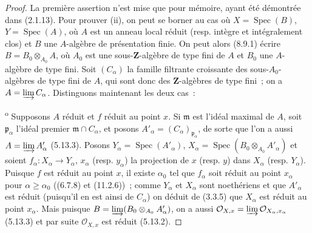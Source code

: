 \begin{proof}
La première assertion n'est mise que pour mémoire, ayant été démontrée dans
(2.1.13). Pour prouver (ii), on peut se borner au cas où $X=\operatorname{Spec}(B)$,
$Y=\operatorname{Spec}(A)$, où $A$ est un anneau local réduit (resp. intègre et
intégralement clos) et $B$ une $A$-algèbre de présentation finie. On peut alors
(8.9.1) écrire $B=B_0\otimes_{A_0}A$,
où $A_0$ est une sous-$\mathbf Z$-algèbre de type fini de $A$ et $B_0$ une
$A$-algèbre de type fini. Soit $(C_\alpha)$ la famille filtrante croissante
des sous-$A_0$-algèbres de type fini de $A$, qui sont donc des
$\mathbf Z$-algèbres de type fini~; on a $A=\varinjlim C_\alpha$. Distinguons
maintenant les deux cas~:

\textsuperscript{o} Supposons $A$ réduit et $f$ réduit au point
$x$. Si $\mathfrak m$ est l'idéal maximal de $A$, soit
$\mathfrak p_\alpha$ l'idéal premier $\mathfrak m\cap C_\alpha$, et posons
$A'_\alpha=(C_\alpha)_{\mathfrak p_\alpha}$, de sorte que l'on a aussi
$A=\varinjlim A'_\alpha$ (5.13.3). Posons
$Y_\alpha=\operatorname{Spec}(A'_\alpha)$,
$X_\alpha=\operatorname{Spec}(B_0\otimes_{A_0}A'_\alpha)$ et soient
$f_\alpha:X_\alpha\to Y_\alpha$, $x_\alpha$ (resp. $y_\alpha$) la projection
de $x$ (resp. $y$) dans $X_\alpha$ (resp. $Y_\alpha$). Puisque $f$ est réduit
au point $x$, il existe $\alpha_0$ tel que $f_\alpha$ soit réduit au point
$x_\alpha$ pour $\alpha\geq\alpha_0$ ((6.7.8) et (11.2.6))~; comme
$Y_\alpha$ et $X_\alpha$ sont noethériens et que $A'_\alpha$ est réduit
(puisqu'il en est ainsi de $C_\alpha$) on déduit de (3.3.5) que $X_\alpha$
est réduit au point $x_\alpha$. Mais puisque
$B=\varinjlim(B_0\otimes_{A_0}A'_\alpha)$, on a aussi
$\mathcal O_{X,x}=\varinjlim\mathcal O_{X_\alpha,x_\alpha}$ (5.13.3) et par
suite $\mathcal O_{X,x}$ est réduit (5.13.2).


\end{proof}
